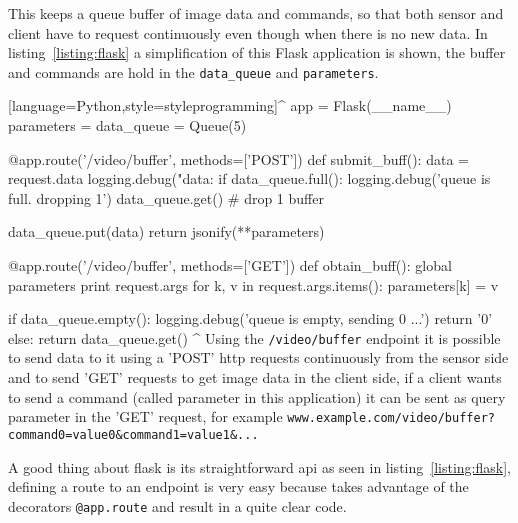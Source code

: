 \documentclass[hidelinks,11pt,a4paper,oneside,article]{memoir}
\begin{document}
This keeps a queue buffer of image data and commands, so that both sensor and client have to request continuously even though when there is no new data. In listing~\ref{listing:flask} a simplification of this Flask application is shown, the buffer and commands are hold in the \texttt{data\_queue} and \texttt{parameters}.

[language=Python,style=styleprogramming]^
app = Flask(__name__)
parameters = {}
data_queue = Queue(5)

@app.route('/video/buffer', methods=['POST'])
def submit_buff():
    data = request.data
    logging.debug("data:%
    if data_queue.full():
        logging.debug('queue is full. dropping 1')
        data_queue.get() # drop 1 buffer
    
    data_queue.put(data)
    return jsonify(**parameters)


@app.route('/video/buffer', methods=['GET'])
def obtain_buff():
    global parameters
    print request.args
    for k, v in request.args.items():
        parameters[k] = v
        
    if data_queue.empty():
        logging.debug('queue is empty, sending 0 ...')
        return '0'
    else:
        return data_queue.get()
^
Using the \texttt{/video/buffer} endpoint it is possible to send data to it using a 'POST' \gls{http} requests continuously from the sensor side and to send 'GET' requests to get image data in the client side, if a client wants to send a command (called parameter in this application) it can be sent as query parameter in the 'GET' request, for example \texttt{www.example.com/video/buffer?command0=value0\&command1=value1\&...}

A good thing about flask is its straightforward \gls{api} as seen in listing~\ref{listing:flask}, defining a route to an endpoint is very easy because takes advantage of the decorators \texttt{@app.route} and result in a quite clear code.
\end{document}
